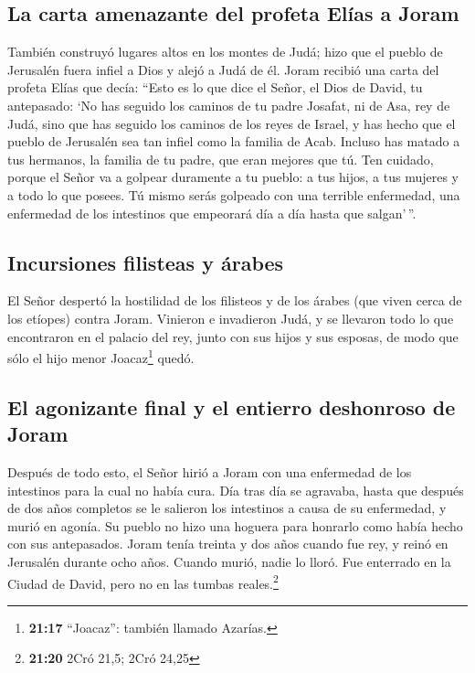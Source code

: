 \hypertarget{la-carta-amenazante-del-profeta-eluxedas-a-joram}{%
\subsection{La carta amenazante del profeta Elías a
Joram}\label{la-carta-amenazante-del-profeta-eluxedas-a-joram}}

 También construyó lugares altos en los montes de Judá;
hizo que el pueblo de Jerusalén fuera infiel a Dios y alejó a Judá de
él.  Joram recibió una carta del profeta Elías que decía:
``Esto es lo que dice el Señor, el Dios de David, tu antepasado: `No has
seguido los caminos de tu padre Josafat, ni de Asa, rey de Judá,
 sino que has seguido los caminos de los reyes de Israel,
y has hecho que el pueblo de Jerusalén sea tan infiel como la familia de
Acab. Incluso has matado a tus hermanos, la familia de tu padre, que
eran mejores que tú.  Ten cuidado, porque el Señor va a
golpear duramente a tu pueblo: a tus hijos, a tus mujeres y a todo lo
que posees.  Tú mismo serás golpeado con una terrible
enfermedad, una enfermedad de los intestinos que empeorará día a día
hasta que salgan'\,''.

\hypertarget{incursiones-filisteas-y-uxe1rabes}{%
\subsection{Incursiones filisteas y
árabes}\label{incursiones-filisteas-y-uxe1rabes}}

 El Señor despertó la hostilidad de los filisteos y de
los árabes (que viven cerca de los etíopes) contra Joram.
 Vinieron e invadieron Judá, y se llevaron todo lo que
encontraron en el palacio del rey, junto con sus hijos y sus esposas, de
modo que sólo el hijo menor Joacaz\footnote{\textbf{21:17} ``Joacaz'':
  también llamado Azarías.} quedó.

\hypertarget{el-agonizante-final-y-el-entierro-deshonroso-de-joram}{%
\subsection{El agonizante final y el entierro deshonroso de
Joram}\label{el-agonizante-final-y-el-entierro-deshonroso-de-joram}}

 Después de todo esto, el Señor hirió a Joram con una
enfermedad de los intestinos para la cual no había cura. 
Día tras día se agravaba, hasta que después de dos años completos se le
salieron los intestinos a causa de su enfermedad, y murió en agonía. Su
pueblo no hizo una hoguera para honrarlo como había hecho con sus
antepasados.  Joram tenía treinta y dos años cuando fue
rey, y reinó en Jerusalén durante ocho años. Cuando murió, nadie lo
lloró. Fue enterrado en la Ciudad de David, pero no en las tumbas
reales.\footnote{\textbf{21:20} 2Cró 21,5; 2Cró 24,25}

